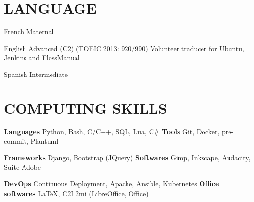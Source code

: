 \documentclass[11pt,a4paper]{moderncv}
\begin{document}






  \section{LANGUAGE}

  \cvlanguage
    {French}
    {Maternal}{}{}{}{}

  \cvlanguage
    {English}
    {Advanced (C2) (TOEIC 2013: 920/990)}
    {Volunteer traducer for Ubuntu, Jenkins and FlossManual}

  \cvlanguage
    {Spanish}
    {Intermediate}
    {}{}{}{}

  \section{COMPUTING SKILLS}

  \cvcomputer
    {\textbf{Languages}}
    {Python, Bash, C/C++, SQL, Lua, C\#}
    {\textbf{Tools}}
    {Git, Docker, pre-commit, Plantuml}

  \cvcomputer
    {\textbf{Frameworks}}
    {Django, Bootstrap (JQuery)}
    {\textbf{Softwares}}
    {Gimp, Inkscape, Audacity, Suite Adobe}

  \cvcomputer
    {\textbf{DevOps}}
    {Continuous Deployment, Apache, Ansible, Kubernetes}
    {\textbf{Office softwares}}
    {\LaTeX{}, C2I 2mi (LibreOffice, Office)}
\end{document}
